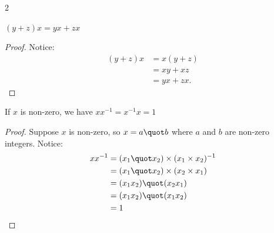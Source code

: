 \begin{multicols}{2}
\begin{proposition}
	$(y + z) x = yx + zx$
\end{proposition}
\begin{proof}
	Notice:
	\begin{align*}
		(y + z) x &= x (y + z) \\
		&= xy + xz \\
		&= yx + zx.
	\end{align*}
\end{proof}

\begin{proposition}
    If $x$ is non-zero, we have $xx^{-1} = x^{-1}x = 1$
\end{proposition}
\begin{proof}
    Suppose $x$ is non-zero, so $x = a \quot b$ where $a$ and $b$ are non-zero integers. Notice:
    \begin{align*}
        xx^{-1} &= (x_1 \quot x_2) \times (x_1 \times x_2)^{-1} \\
         &= (x_1 \quot x_2) \times (x_2 \times x_1) \\
         &= (x_1 x_2) \quot (x_2 x_1) \\
         &= (x_1 x_2) \quot (x_1 x_2) \\
         &= 1
    \end{align*}
\end{proof}

\end{multicols}

